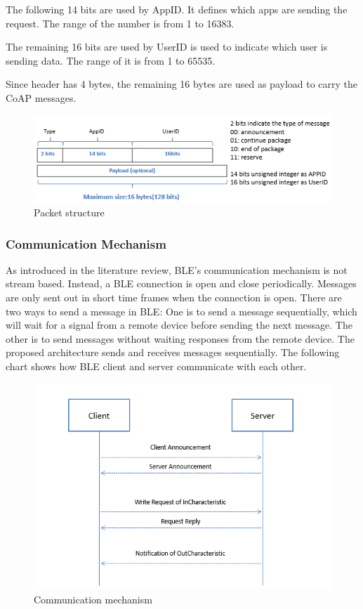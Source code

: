\documentclass{Nan_Thesis}
\begin{document}
The following 14 bits are used by AppID. It defines which apps are sending the request. The range of the number is from 1 to 16383. 

The remaining 16 bits are used by UserID is used to indicate which user is sending data.  The range of it is from 1 to 65535. 

Since header has 4 bytes, the remaining 16 bytes are used as payload to carry the CoAP messages.

\begin{figure}[H]
  \centering 
      \includegraphics[scale=1]{pic/packetstructure.png} 
  \caption{Packet structure}
\end{figure}

\subsubsection{Communication Mechanism}
As introduced in the literature review, BLE’s communication mechanism is not stream based. Instead, a BLE connection is open and close periodically. Messages are only sent out in short time frames when the connection is open. There are two ways to send a message in BLE: One is to send a message sequentially, which will wait for a signal from a remote device before sending the next message. The other is to send messages without waiting responses from the remote device. The proposed architecture sends and receives messages sequentially. The following chart shows how BLE client and server communicate with each other.

\begin{figure}[H]
  \centering 
      \includegraphics[scale=1]{pic/communicationmechanism.png} 
  \caption{Communication mechanism}
\end{figure}
\end{document}
